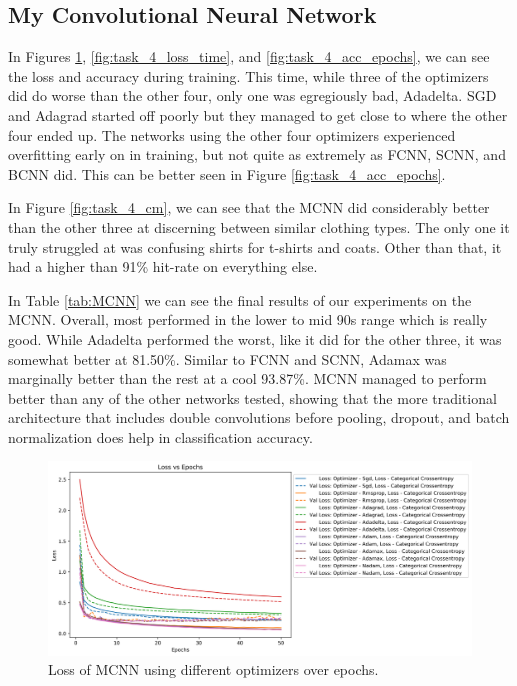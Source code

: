 \documentclass[12pt]{article}
\begin{document}
\subsection{My Convolutional Neural Network}

In Figures \ref{fig:task_4_loss_epochs}, \ref{fig:task_4_loss_time}, and \ref{fig:task_4_acc_epochs}, we can see
 the loss and accuracy during training.
This time, while three of the optimizers did do worse than the other four, only one was egregiously bad, Adadelta.
SGD and Adagrad started off poorly but they managed to get close to where the other four ended up.
The networks using the other four optimizers experienced overfitting early on in training, but not quite as extremely as FCNN, SCNN, and BCNN did.
This can be better seen in Figure \ref{fig:task_4_acc_epochs}.

In Figure \ref{fig:task_4_cm}, we can see that the MCNN did considerably better than the other three
 at discerning between similar clothing types.
The only one it truly struggled at was confusing shirts for t-shirts and coats.
Other than that, it had a higher than 91\% hit-rate on everything else.

In Table \ref{tab:MCNN} we can see the final results of our experiments on the MCNN.
Overall, most performed in the lower to mid 90s range which is really good.
While Adadelta performed the worst, like it did for the other three, it was somewhat better at 81.50\%.
Similar to FCNN and SCNN, Adamax was marginally better than the rest at a cool 93.87\%.
MCNN managed to perform better than any of the other networks tested, showing that the more traditional architecture
 that includes double convolutions before pooling, dropout, and batch normalization does help in classification accuracy.

\begin{figure}
  \centering
  \includegraphics[width=\linewidth]{task_4_loss_epochs.png}
  \caption{Loss of MCNN using different optimizers over epochs.}
  \label{fig:task_4_loss_epochs}
\end{figure}
\end{document}
